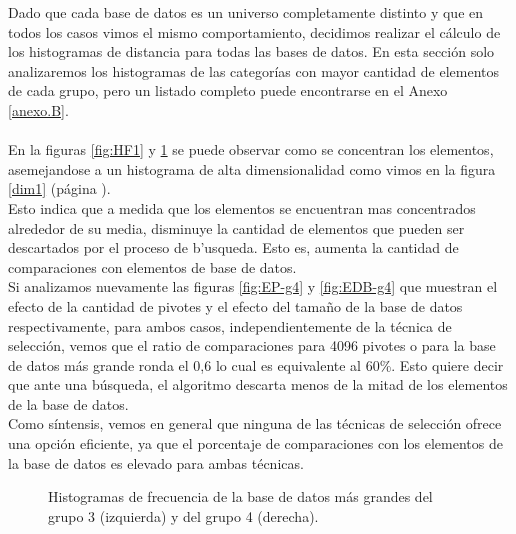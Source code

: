 Dado que cada base de datos es un universo completamente distinto y que en todos los casos vimos el mismo comportamiento, decidimos realizar el c\'alculo de los histogramas de distancia para todas las bases de datos. En esta secci\'on solo analizaremos los histogramas de las categor\'ias con mayor cantidad de elementos de cada grupo, pero un listado completo puede encontrarse en el Anexo \ref{anexo.B}.\\\\

En la figuras \ref{fig:HF1} y \ref{fig:HF2} se puede observar como se concentran los elementos, asemejandose a un histograma de alta dimensionalidad como vimos en la figura \ref{dim1} (p\'agina \pageref{dim1}).\\

Esto indica que a medida que los elementos se encuentran mas concentrados alrededor de su media, disminuye la cantidad de elementos que pueden ser descartados por el proceso de b'usqueda. Esto es, aumenta la cantidad de comparaciones con elementos de base de datos.\\

Si analizamos nuevamente las figuras \ref{fig:EP-g4} y \ref{fig:EDB-g4} que muestran el efecto de la cantidad de pivotes y el efecto del tama\~no de la base de datos respectivamente, para ambos casos, independientemente de la t\'ecnica de selecci\'on, vemos que el ratio de comparaciones para 4096 pivotes o para la base de datos m\'as grande ronda el 0,6 lo cual es equivalente al 60\%. Esto quiere decir que ante una b\'usqueda, el algoritmo descarta menos de la mitad de los elementos de la base de datos.\\

Como s\'intensis, vemos en general que ninguna de las t\'ecnicas de selecci\'on ofrece una opci\'on eficiente, ya que el porcentaje de comparaciones con los elementos de la base de datos es elevado para ambas t\'ecnicas.\\

\begin{figure}[tb]
\centering
{}
		\caption{\small Histogramas de frecuencia de la base de datos m\'as grandes del grupo 1 (izquierda) y del grupo 2 (derecha).}
		\label{fig:HF1}
		
	\caption{\small Histogramas de frecuencia de la base de datos m\'as grandes del grupo 3 (izquierda) y del grupo 4 (derecha).}
		\label{fig:HF2}
\end{figure}


